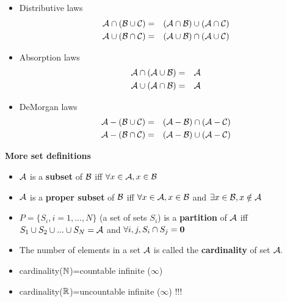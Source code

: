 \documentclass[justified,sixbynine]{tufte-book}
\def\subsubsection#1{{\bf #1}}
\theoremstyle{plain}%
\theoremstyle{definition}
\theoremstyle{remark}
\begin{document}
\begin{fullwidth}
\begin{itemize}
\item  Distributive laws
\begin{eqnarray}
{\cal A}\cap ({\cal B}\cup {\cal C}) &=&({\cal A}\cap {\cal B})\cup ({\cal A}%
\cap {\cal C}) \\
{\cal A}\cup ({\cal B}\cap {\cal C}) &=&({\cal A}\cup {\cal B})\cap ({\cal A}%
\cup {\cal C})
\end{eqnarray}

\item  Absorption laws
\begin{eqnarray}
{\cal A}\cap ({\cal A}\cup {\cal B}) &=&{\cal A} \\
{\cal A}\cup ({\cal A}\cap {\cal B}) &=&{\cal A}
\end{eqnarray}

\item  DeMorgan laws
\begin{eqnarray}
{\cal A}-({\cal B}\cup {\cal C}) &=&({\cal A}-{\cal B})\cap ({\cal A}-{\cal C%
}) \\
{\cal A}-({\cal B}\cap {\cal C}) &=&({\cal A}-{\cal B})\cup ({\cal A}-{\cal C%
})
\end{eqnarray}
\end{itemize}

\subsubsection{More set definitions}

\begin{itemize}
\item  ${\cal A}$ is a {\bf subset} of ${\cal B}$ iff $\forall x\in {\cal A}%
,x\in {\cal B}$

\item  ${\cal A}$ is a {\bf proper subset} of ${\cal B}$ iff $\forall x\in
{\cal A},x\in {\cal B}$ and $\exists x\in {\cal B},x\notin {\cal A}$

\item  $P=\{S_i,i=1,...,N\}$ (a set of sets $S_i$) is a {\bf partition} of $%
{\cal A}$ iff $S_1\cup S_2\cup ...\cup S_N={\cal A}$ and $\forall
i,j,S_i\cap S_j={\bf 0}$

\item  The number of elements in a set ${\cal A}$ is called the {\bf %
cardinality} of set ${\cal A}.$

\item  cardinality(${\Bbb N}$)=countable infinite ($\infty $)

\item  cardinality(${\Bbb R}$)=uncountable infinite ($\infty $) !!!
\end{itemize}



\end{fullwidth}
\end{document}
